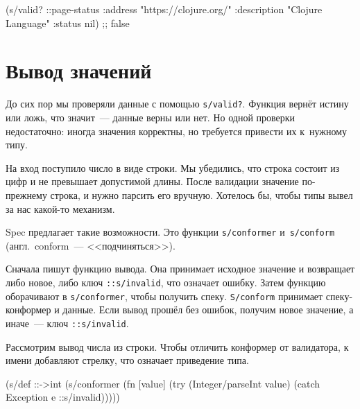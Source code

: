 \begin{english}
  \begin{clojure}
(s/valid? ::page-status
          {:address "https://clojure.org/"
           :description "Clojure Language"
           :status nil})
;; false
  \end{clojure}
\end{english}

\section{Вывод значений}

\label{spec-conform}


До сих пор мы проверяли данные с помощью \verb|s/valid?|. Функция вернёт
истину или ложь, что значит~--- данные верны или нет. Но одной проверки
недостаточно: иногда значения корректны, но требуется привести их к~нужному
типу.

На вход поступило число в виде строки. Мы убедились, что строка состоит из цифр
и не превышает допустимой длины. После валидации значение по-прежнему строка, и
нужно парсить его вручную. Хотелось бы, чтобы типы вывел за нас какой-то
механизм.


Spec предлагает такие возможности. Это функции \verb|s/conformer|
и~\verb|s/conform| (англ.~conform~--- <<подчиняться>>).

\label{spec-invalid}



Сначала пишут функцию вывода. Она принимает исходное значение и возвращает либо
новое, либо ключ \verb|::s/invalid|, что означает ошибку. Затем функцию
оборачивают в \verb|s/conformer|, чтобы получить спеку. \verb|S/conform|
принимает спеку-конформер и данные. Если вывод прошёл без ошибок, получим новое
значение, а иначе~--- ключ \verb|::s/invalid|.

Рассмотрим вывод числа из строки. Чтобы отличить конформер от валидатора, к
имени добавляют стрелку, что означает приведение типа.

\begin{english}
  \begin{clojure}
(s/def ::->int
  (s/conformer
   (fn [value]
     (try
       (Integer/parseInt value)
       (catch Exception e
         ::s/invalid)))))
  \end{clojure}
\end{english}

